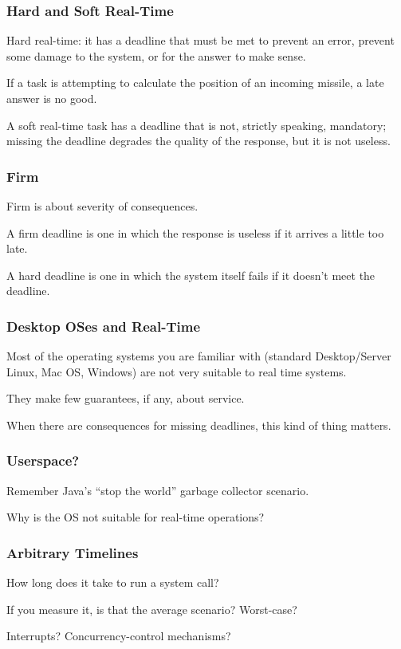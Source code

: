 \begin{frame}
\frametitle{Hard and Soft Real-Time}

\alert{Hard real-time}: it has a deadline that must be met to prevent an error, prevent some damage to the system, or for the answer to make sense. 

If a task is attempting to calculate the position of an incoming missile, a late answer is no good. 

A \alert{soft real-time} task has a deadline that is not, strictly speaking, mandatory; missing the deadline degrades the quality of the response, but it is not useless.

\end{frame}

\begin{frame}
\frametitle{Firm}

Firm is about severity of consequences. 

A firm deadline is one in which the response is useless if it arrives a little too late.

A hard deadline is one in which the system itself fails if it doesn't meet the deadline.
\end{frame}

\begin{frame}
\frametitle{Desktop OSes and Real-Time}

Most of the operating systems you are familiar with (standard Desktop/Server Linux, Mac OS, Windows) are not very suitable to real time systems. 

They make few guarantees, if any, about service. 

When there are consequences for missing deadlines, this kind of thing matters. 

\end{frame}


\begin{frame}
\frametitle{Userspace?}

Remember Java's ``stop the world'' garbage collector scenario.

Why is the OS not suitable for real-time operations?

\end{frame}

\begin{frame}
\frametitle{Arbitrary Timelines}

How long does it take to run a system call?

If you measure it, is that the average scenario? Worst-case?

Interrupts? Concurrency-control mechanisms?

\end{frame}

